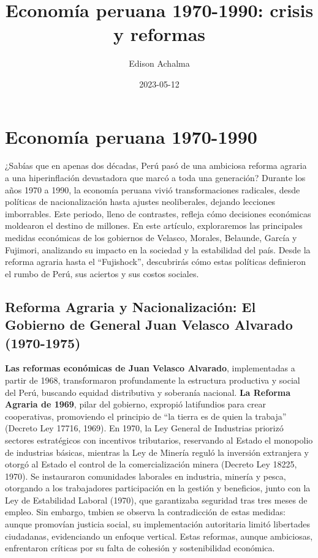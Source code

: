 \documentclass[
  jou,
  floatsintext,
  longtable,
  a4paper,
  nolmodern,
  notxfonts,
  notimes,
  12pt,
  colorlinks=true,linkcolor=blue,citecolor=blue,urlcolor=blue]{apa7}
\title{Economía peruana 1970-1990: crisis y reformas}
\author{Edison Achalma}
\affiliation{
{Escuela Profesional de Economía, Universidad Nacional de San Cristóbal
de Huamanga}}
\date{2023-05-12}
\begin{document}
\maketitle


\hypertarget{toc}{}
\tableofcontents
\newpage
\section[Introduction]{Economía peruana 1970-1990}

\setcounter{secnumdepth}{3}

\setlength\LTleft{0pt}




¿Sabías que en apenas dos décadas, Perú pasó de una ambiciosa reforma
agraria a una hiperinflación devastadora que marcó a toda una
generación? Durante los años 1970 a 1990, la economía peruana vivió
transformaciones radicales, desde políticas de nacionalización hasta
ajustes neoliberales, dejando lecciones imborrables. Este periodo, lleno
de contrastes, refleja cómo decisiones económicas moldearon el destino
de millones. En este artículo, exploraremos las principales medidas
económicas de los gobiernos de Velasco, Morales, Belaunde, García y
Fujimori, analizando su impacto en la sociedad y la estabilidad del
país. Desde la reforma agraria hasta el ``Fujishock'', descubrirás cómo
estas políticas definieron el rumbo de Perú, sus aciertos y sus costos
sociales.

\subsection{Reforma Agraria y Nacionalización: El Gobierno de General
Juan Velasco Alvarado
(1970-1975)}\label{reforma-agraria-y-nacionalizaciuxf3n-el-gobierno-de-general-juan-velasco-alvarado-1970-1975}

\textbf{Las reformas económicas de Juan Velasco Alvarado}, implementadas
a partir de 1968, transformaron profundamente la estructura productiva y
social del Perú, buscando equidad distributiva y soberanía nacional.
\textbf{La Reforma Agraria de 1969}, pilar del gobierno, expropió
latifundios para crear cooperativas, promoviendo el principio de ``la
tierra es de quien la trabaja'' (Decreto Ley 17716, 1969). En 1970, la
Ley General de Industrias priorizó sectores estratégicos con incentivos
tributarios, reservando al Estado el monopolio de industrias básicas,
mientras la Ley de Minería reguló la inversión extranjera y otorgó al
Estado el control de la comercialización minera (Decreto Ley 18225,
1970). Se instauraron comunidades laborales en industria, minería y
pesca, otorgando a los trabajadores participación en la gestión y
beneficios, junto con la Ley de Estabilidad Laboral (1970), que
garantizaba seguridad tras tres meses de empleo. Sin embargo, tmbien se
observa la contradicción de estas medidas: aunque promovían justicia
social, su implementación autoritaria limitó libertades ciudadanas,
evidenciando un enfoque vertical. Estas reformas, aunque ambiciosas,
enfrentaron críticas por su falta de cohesión y sostenibilidad
económica.
\end{document}
